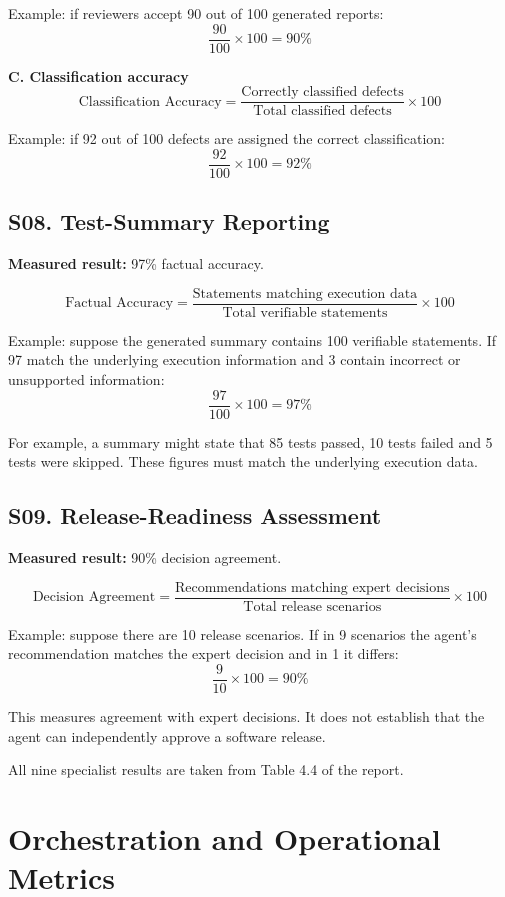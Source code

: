 \documentclass[11pt,a4paper]{article}
\begin{document}
Example: if reviewers accept 90 out of 100 generated reports:
\[
\frac{90}{100}\times 100=90\%
\]

\textbf{C. Classification accuracy}
\[
\text{Classification Accuracy} =
\frac{\text{Correctly classified defects}}
     {\text{Total classified defects}}\times 100
\]

Example: if 92 out of 100 defects are assigned the correct classification:
\[
\frac{92}{100}\times 100=92\%
\]

\subsection{S08. Test-Summary Reporting}

\textbf{Measured result:} 97\% factual accuracy.

\[
\text{Factual Accuracy} =
\frac{\text{Statements matching execution data}}
     {\text{Total verifiable statements}}\times 100
\]

Example: suppose the generated summary contains 100 verifiable statements. If 97 match the underlying execution information and 3 contain incorrect or unsupported information:
\[
\frac{97}{100}\times 100=97\%
\]

For example, a summary might state that 85 tests passed, 10 tests failed and 5 tests were skipped. These figures must match the underlying execution data.

\subsection{S09. Release-Readiness Assessment}

\textbf{Measured result:} 90\% decision agreement.

\[
\text{Decision Agreement} =
\frac{\text{Recommendations matching expert decisions}}
     {\text{Total release scenarios}}\times 100
\]

Example: suppose there are 10 release scenarios. If in 9 scenarios the agent's recommendation matches the expert decision and in 1 it differs:
\[
\frac{9}{10}\times 100=90\%
\]

This measures agreement with expert decisions. It does not establish that the agent can independently approve a software release.

All nine specialist results are taken from Table 4.4 of the report.

\section{Orchestration and Operational Metrics}
\end{document}
